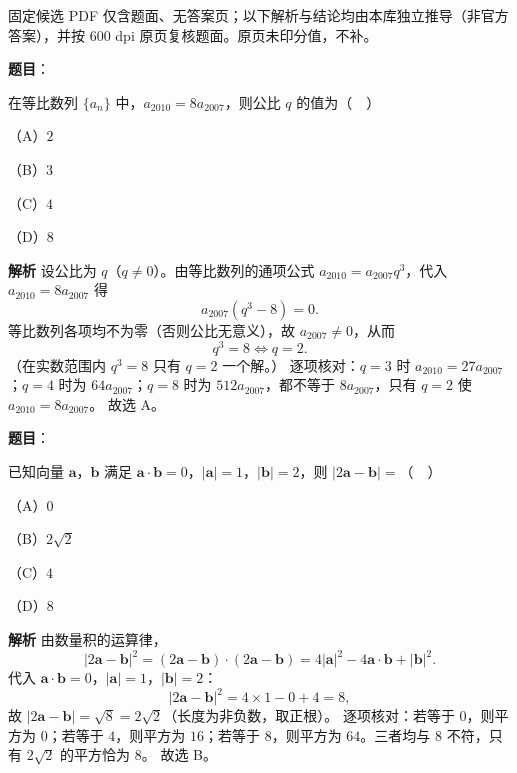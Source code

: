 \begin{gktip}
固定候选 PDF 仅含题面、无答案页；以下解析与结论均由本库独立推导（非官方答案），并按 600 dpi 原页复核题面。原页未印分值，不补。
\end{gktip}

\begin{answer}

\textbf{题目}：

在等比数列 $\{a_n\}$ 中，$a_{2010}=8a_{2007}$，则公比 $q$ 的值为（　）

（A）$2$

（B）$3$

（C）$4$

（D）$8$

\textbf{解析}
设公比为 $q$（$q\neq0$）。由等比数列的通项公式 $a_{2010}=a_{2007}q^{3}$，代入 $a_{2010}=8a_{2007}$ 得
\nopagebreak[4]
\[a_{2007}\left(q^3-8\right)=0.\]
等比数列各项均不为零（否则公比无意义），故 $a_{2007}\neq0$，从而
\nopagebreak[4]
\[q^3=8\iff q=2.\]
（在实数范围内 $q^3=8$ 只有 $q=2$ 一个解。）
逐项核对：$q=3$ 时 $a_{2010}=27a_{2007}$；$q=4$ 时为 $64a_{2007}$；$q=8$ 时为 $512a_{2007}$，都不等于 $8a_{2007}$，只有 $q=2$ 使 $a_{2010}=8a_{2007}$。
故选 A。


\end{answer}
\begin{answer}

\textbf{题目}：

已知向量 $\boldsymbol a$，$\boldsymbol b$ 满足 $\boldsymbol a\cdot\boldsymbol b=0$，$|\boldsymbol a|=1$，$|\boldsymbol b|=2$，则 $|2\boldsymbol a-\boldsymbol b|=$（　）

（A）$0$

（B）$2\sqrt2$

（C）$4$

（D）$8$

\textbf{解析}
由数量积的运算律，
\nopagebreak[4]
\[\left|2\boldsymbol a-\boldsymbol b\right|^2=\left(2\boldsymbol a-\boldsymbol b\right)\cdot\left(2\boldsymbol a-\boldsymbol b\right)=4\left|\boldsymbol a\right|^2-4\boldsymbol a\cdot\boldsymbol b+\left|\boldsymbol b\right|^2.\]
代入 $\boldsymbol a\cdot\boldsymbol b=0$，$\left|\boldsymbol a\right|=1$，$\left|\boldsymbol b\right|=2$：
\nopagebreak[4]
\[\left|2\boldsymbol a-\boldsymbol b\right|^2=4\times1-0+4=8,\]
故 $\left|2\boldsymbol a-\boldsymbol b\right|=\sqrt8=2\sqrt2$（长度为非负数，取正根）。
逐项核对：若等于 $0$，则平方为 $0$；若等于 $4$，则平方为 $16$；若等于 $8$，则平方为 $64$。三者均与 $8$ 不符，只有 $2\sqrt2$ 的平方恰为 $8$。
故选 B。


\end{answer}
